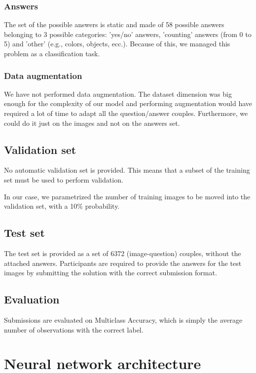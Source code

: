 \documentclass[12pt,a4paper]{report}
\begin{document}
	\subsection{Answers}
The set of the possible answers is static and made of 58 possible answers belonging to 3 possible categories: 'yes/no' answers, 'counting' answers (from 0 to 5) and 'other' (e.g., colors, objects, ecc.). Because of this, we managed this problem as a classification task.

	\subsection{Data augmentation}
We have not performed data augmentation. The dataset dimension was big enough for the complexity of our model and performing augmentation would have required a lot of time to adapt all the question/answer couples. Furthermore, we could do it just on the images and not on the answers set.
	\section{Validation set}

No automatic validation set is provided. This means that a subset of the training set must be used to perform validation.

In our case, we parametrized the number of training images to be moved into the validation set, with a 10\% probability.


	\section{Test set}
The test set is provided as a set of 6372 (image-question) couples, without the attached answers. Participants are required to provide the answers for the test images by submitting the solution with the correct submission format.

	\section{Evaluation}
Submissions are evaluated on Multiclass Accuracy, which is simply the average number of observations with the correct label.


	\chapter{Neural network architecture}		
\end{document}
